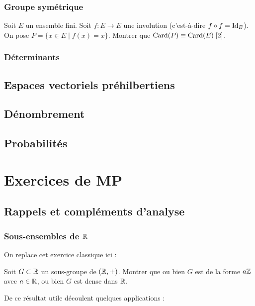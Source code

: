 \documentclass[12pt,a4paper]{exo_book}
\begin{document}
\section{Groupe symétrique}

\begin{exo}
    Soit $E$ un ensemble fini. Soit $f : E \to E$ une involution (c'est-à-dire $f \circ f = \mathrm{Id}_E$). On pose $P = \{x\in E \mid f(x) = x\}$. Montrer que $\operatorname{Card} (P) \equiv \operatorname{Card} (E) \; [2]$.
\end{exo}

\section{Déterminants}

\chapter{Espaces vectoriels préhilbertiens}

\chapter{Dénombrement}

\chapter{Probabilités}

\part{Exercices de MP}

\chapter{Rappels et compléments d'analyse}

\section{Sous-ensembles de $\mathbb{R}$}

On replace cet exercice classique ici :

\begin{exo}
    Soit $G \subset \mathbb{R}$ un sous-groupe de $(\mathbb{R},+)$. Montrer que ou bien $G$ est de la forme $a\mathbb{Z}$ avec $a \in \mathbb{R}$, ou bien $G$ est dense dans $\mathbb{R}$.
\end{exo}

De ce résultat utile découlent quelques applications :
\end{document}
